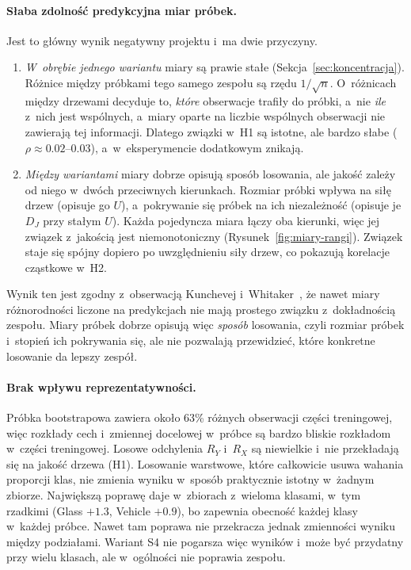 \paragraph{Słaba zdolność predykcyjna miar próbek.} Jest to główny wynik negatywny projektu i~ma dwie przyczyny.
\begin{enumerate}
  \item \emph{W~obrębie jednego wariantu} miary są prawie stałe (Sekcja~\ref{sec:koncentracja}). Różnice między próbkami tego samego zespołu są rzędu $1/\sqrt{n}$. O~różnicach między drzewami decyduje to, \emph{które} obserwacje trafiły do próbki, a~nie \emph{ile} z~nich jest wspólnych, a~miary oparte na liczbie wspólnych obserwacji nie zawierają tej informacji. Dlatego związki w~H1 są istotne, ale bardzo słabe ($\rho\approx0.02$--$0.03$), a~w~eksperymencie dodatkowym znikają.
  \item \emph{Między wariantami} miary dobrze opisują sposób losowania, ale jakość zależy od niego w~dwóch przeciwnych kierunkach. Rozmiar próbki wpływa na siłę drzew (opisuje go $U$), a~pokrywanie się próbek na ich niezależność (opisuje je $D_J$ przy stałym $U$). Każda pojedyncza miara łączy oba kierunki, więc jej związek z~jakością jest niemonotoniczny (Rysunek~\ref{fig:miary-rangi}). Związek staje się spójny dopiero po uwzględnieniu siły drzew, co pokazują korelacje cząstkowe w~H2.
\end{enumerate}
Wynik ten jest zgodny z~obserwacją Kunchevej i~Whitaker~\cite{kuncheva2003}, że nawet miary różnorodności liczone na predykcjach nie mają prostego związku z~dokładnością zespołu. Miary próbek dobrze opisują więc \emph{sposób} losowania, czyli rozmiar próbek i~stopień ich pokrywania się, ale nie pozwalają przewidzieć, które konkretne losowanie da lepszy zespół.

\paragraph{Brak wpływu reprezentatywności.} Próbka bootstrapowa zawiera około 63\% różnych obserwacji części treningowej, więc rozkłady cech i~zmiennej docelowej w~próbce są bardzo bliskie rozkładom w~części treningowej. Losowe odchylenia $R_Y$ i~$R_X$ są niewielkie i~nie przekładają się na jakość drzewa (H1). Losowanie warstwowe, które całkowicie usuwa wahania proporcji klas, nie zmienia wyniku w~sposób praktycznie istotny w~żadnym zbiorze. Największą poprawę daje w~zbiorach z~wieloma klasami, w~tym rzadkimi (Glass $+1.3$\pp, Vehicle $+0.9$\pp), bo zapewnia obecność każdej klasy w~każdej próbce. Nawet tam poprawa nie przekracza jednak zmienności wyniku między podziałami. Wariant S4 nie pogarsza więc wyników i~może być przydatny przy wielu klasach, ale w~ogólności nie poprawia zespołu.

